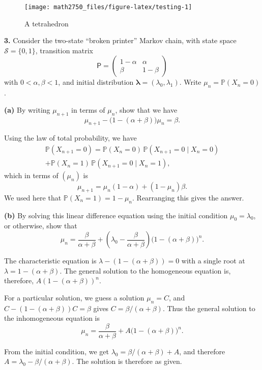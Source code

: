 \documentclass[
  a4paper,
]{article}
\theoremstyle{definition}
\theoremstyle{definition}
\theoremstyle{definition}
\theoremstyle{remark}
\begin{document}
\begin{figure}

{\centering \texttt{[image: math2750\_files/figure-latex/testing-1]} 

}

\caption{A tetrahedron}\label{fig:testing}
\end{figure}

\textbf{3.} Consider the two-state ``broken printer'' Markov chain, with state space \(\mathcal S = \{0,1\}\), transition matrix
\[ \mathsf P = \begin{pmatrix} 1-\alpha & \alpha \\
                 \beta & 1-\beta \end{pmatrix} \]
with \(0 < \alpha, \beta < 1\), and initial distribution \(\boldsymbol\lambda = (\lambda_0, \lambda_1)\). Write \(\mu_n =\mathbb P(X_n = 0)\).

\textbf{(a)} By writing \(\mu_{n+1}\) in terms of \(\mu_n\), show that we have
\[ \mu_{n+1} - \big(1-(\alpha+\beta)\big)\mu_n = \beta . \]

\begin{myanswers}
Using the law of total probability, we have
\begin{multline*}
\mathbb P(X_{n+1} = 0) = \mathbb P(X_n = 0)\,\mathbb P(X_{n+1} = 0 \mid X_n = 0) \\
+ \mathbb P(X_n = 1)\,\mathbb P(X_{n+1} = 0 \mid X_n = 1) ,
\end{multline*}
which in terms of \((\mu_n)\) is
\[ \mu_{n+1} = \mu_n (1-\alpha) + (1 - \mu_n)\beta . \]
We used here that \(\mathbb P(X_n = 1) = 1-\mu_n\).
Rearranging this gives the answer.

\end{myanswers}

\textbf{(b)} By solving this linear difference equation using the initial condition \(\mu_0 = \lambda_0\), or otherwise, show that
\[ \mu_n = \frac{\beta}{\alpha+\beta} + \left(\lambda_0 - \frac{\beta}{\alpha+\beta}\right)\big(1-(\alpha+\beta)\big)^n   . \]

\begin{myanswers}
The characteristic equation is \(\lambda - (1-(\alpha+\beta)) = 0\) with a single root at \(\lambda = 1 - (\alpha+\beta)\). The general solution to the homogeneous equation is, therefore, \(A(1-(\alpha+\beta))^n\).

For a particular solution, we guess a solution \(\mu_n = C\), and \(C - (1-(\alpha+\beta))C = \beta\) gives \(C = \beta/(\alpha+\beta)\). Thus the general solution to the inhomogeneous equation is
\[ \mu_n = \frac{\beta}{\alpha+\beta} + A\big(1-(\alpha+\beta)\big)^n .\]

From the initial condition, we get \(\lambda_0 = \beta/(\alpha+\beta) + A\), and therefore \(A = \lambda_0 - \beta/(\alpha+\beta)\). The solution is therefore as given.

\end{myanswers}
\end{document}
